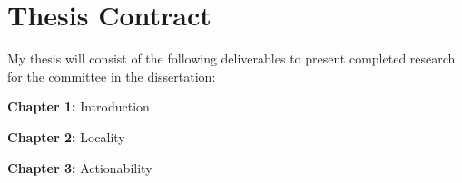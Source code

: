 \section{Thesis Contract}

My thesis will consist of the following deliverables to present completed research for the committee in the dissertation:

\begin{todolist}
  \item \textbf{Chapter 1:} Introduction
  \item \textbf{Chapter 2:} Locality
  \item \textbf{Chapter 3:} Actionability
\end{todolist}
